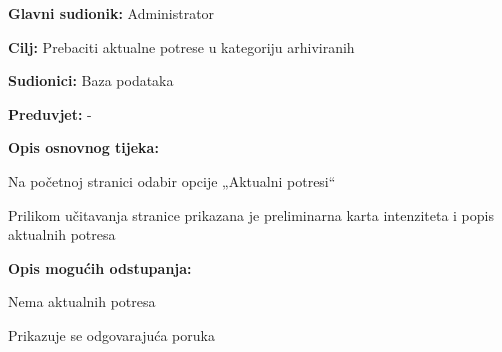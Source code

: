 					\noindent {}
					\begin{packed_item}
	
						\item \textbf{Glavni sudionik:} Administrator
						\item \textbf{Cilj:} Prebaciti aktualne potrese u kategoriju arhiviranih
						\item \textbf{Sudionici:} Baza podataka
						\item \textbf{Preduvjet:} -

						\item \textbf{Opis osnovnog tijeka:}
						
						\item[] \begin{packed_enum}
							\item Na početnoj stranici odabir opcije „Aktualni potresi“
							\item Prilikom učitavanja stranice prikazana je preliminarna karta intenziteta i popis aktualnih potresa
						\end{packed_enum}
						
						\item  \textbf{Opis mogućih odstupanja:}
						
						\item[] \begin{packed_item}
	
							\item[2.a] Nema aktualnih potresa
							\item[] \begin{packed_enum}
								
								\item Prikazuje se odgovarajuća poruka
								
							\end{packed_enum}
							
						\end{packed_item}
						
					\end{packed_item}


